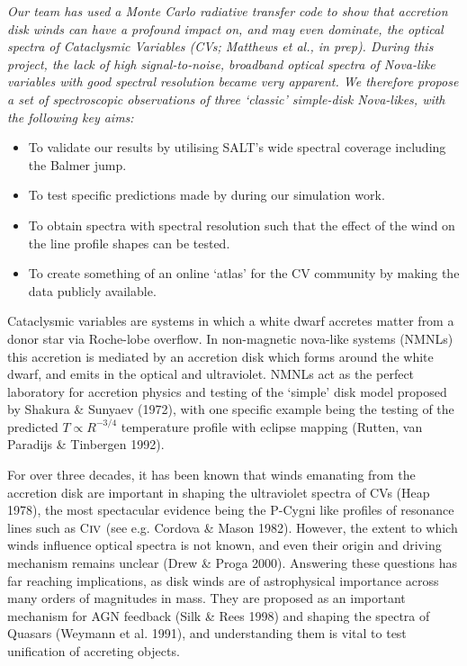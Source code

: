 {\it Our team has used a Monte Carlo radiative transfer code to show that 
accretion disk winds can have a profound impact on, and may even dominate,
the optical spectra of Cataclysmic Variables (CVs; Matthews et al., in prep).
During this project, the lack of high signal-to-noise, broadband optical spectra
of Nova-like variables with good spectral resolution became very apparent.
We therefore propose a set of spectroscopic observations of three `classic' simple-disk
Nova-likes, with the following key aims:

\begin{itemize}
\item To validate our results by utilising SALT's wide spectral coverage including the Balmer jump.
\item To test specific predictions made by during our simulation work.
\item To obtain spectra with spectral resolution such that the effect of the wind on the line profile shapes
can be tested. 
\item To create something of an online `atlas' for the CV community by making the data publicly available.
\end{itemize}
}
\bigskip






Cataclysmic variables are systems in which a white dwarf accretes matter from a donor
star via Roche-lobe overflow. In non-magnetic nova-like systems (NMNLs) this accretion
is mediated by an accretion disk which forms around the white dwarf, and emits in the optical
and ultraviolet. NMNLs act as the perfect laboratory for accretion physics 
and testing of the `simple' disk model proposed by Shakura \& Sunyaev (1972), with one
specific example being the testing of the predicted $T\propto R^{-3/4}$ temperature 
profile with eclipse mapping (Rutten, van
Paradijs \& Tinbergen 1992).
\bigskip


For over three decades, it has been known that winds emanating from the accretion disk
are important in shaping the ultraviolet spectra of CVs (Heap 1978), 
the most spectacular evidence being the P-Cygni like profiles of resonance lines such as 
C${\textsc {iv}}$ (see e.g. Cordova \& Mason 1982). 
However, the extent to which winds influence optical spectra is not known, and even their origin 
and driving mechanism remains unclear (Drew \& Proga 2000). 
Answering these questions has far reaching implications, as
disk winds are of astrophysical importance across many orders of magnitudes in mass.
They are proposed as an important mechanism for AGN feedback (Silk \& Rees 1998) and shaping 
the spectra of Quasars (Weymann et al. 1991), and understanding them is vital to test
unification of accreting objects.

